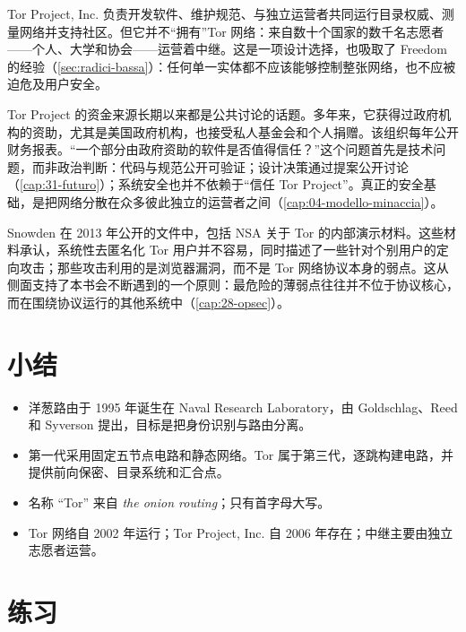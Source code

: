 Tor Project, Inc. 负责开发软件、维护规范、与独立运营者共同运行目录权威、测量网络并支持社区。但它并不“拥有”Tor 网络：来自数十个国家的数千名志愿者——个人、大学和协会——运营着中继。这是一项设计选择，也吸取了 Freedom 的经验（\cref{sec:radici-bassa}）：任何单一实体都不应该能够控制整张网络，也不应被迫危及用户安全。

Tor Project 的资金来源长期以来都是公共讨论的话题。多年来，它获得过政府机构的资助，尤其是美国政府机构，也接受私人基金会和个人捐赠。该组织每年公开财务报表。\enquote{一个部分由政府资助的软件是否值得信任？}这个问题首先是技术问题，而非政治判断：代码与规范公开可验证；设计决策通过提案公开讨论（\cref{cap:31-futuro}）；系统安全也并不依赖于“信任 Tor Project”。真正的安全基础，是把网络分散在众多彼此独立的运营者之间（\cref{cap:04-modello-minaccia}）。

\begin{approfondimento}[2013 年的披露]
Snowden 在 2013 年公开的文件中，包括 NSA 关于 Tor 的内部演示材料。这些材料承认，系统性去匿名化 Tor 用户并不容易，同时描述了一些针对个别用户的定向攻击；那些攻击利用的是浏览器漏洞，而不是 Tor 网络协议本身的弱点。这从侧面支持了本书会不断遇到的一个原则：最危险的薄弱点往往并不位于协议核心，而在围绕协议运行的其他系统中（\cref{cap:28-opsec}）。
\end{approfondimento}

\section*{小结}
\begin{itemize}
  \item 洋葱路由于 1995 年诞生在 Naval Research Laboratory，由 Goldschlag、Reed 和 Syverson 提出，目标是把身份识别与路由分离。
  \item 第一代采用固定五节点电路和静态网络。Tor 属于第三代，逐跳构建电路，并提供前向保密、目录系统和汇合点。
  \item 名称 \enquote{Tor} 来自 \emph{the onion routing}；只有首字母大写。
  \item Tor 网络自 2002 年运行；Tor Project, Inc. 自 2006 年存在；中继主要由独立志愿者运营。
\end{itemize}

\section*{练习}

